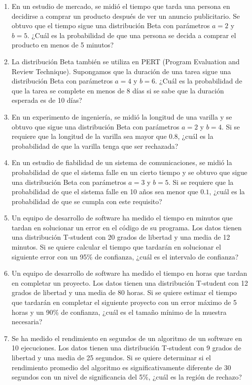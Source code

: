 \begin{Ejer}
\begin{enumerate}
\item En un estudio de mercado, se midió el tiempo que tarda una persona en decidirse a comprar un producto después de ver un anuncio publicitario. Se obtuvo que el tiempo sigue una distribución Beta con parámetros $a=2$ y $b=5$. ¿Cuál es la probabilidad de que una persona se decida a comprar el producto en menos de 5 minutos?

\item La distribución Beta también se utiliza en PERT (Program Evaluation and Review Technique). Supongamos que la duración de una tarea sigue una distribución Beta con parámetros $a=4$ y $b=6$. ¿Cuál es la probabilidad de que la tarea se complete en menos de 8 días si se sabe que la duración esperada es de 10 días?

\item En un experimento de ingeniería, se midió la longitud de una varilla y se obtuvo que sigue una distribución Beta con parámetros $a=2$ y $b=4$. Si se requiere que la longitud de la varilla sea mayor que $0.8$, ¿cuál es la probabilidad de que la varilla tenga que ser rechazada?

\item En un estudio de fiabilidad de un sistema de comunicaciones, se midió la probabilidad de que el sistema falle en un cierto tiempo y se obtuvo que sigue una distribución Beta con parámetros $a=3$ y $b=5$. Si se requiere que la probabilidad de que el sistema falle en 10 años sea menor que $0.1$, ¿cuál es la probabilidad de que se cumpla con este requisito?

\item Un equipo de desarrollo de software ha medido el tiempo en minutos que tardan en solucionar un error en el c\'odigo de su programa. Los datos tienen una distribuci\'on T-student con 20 grados de libertad y una media de 12 minutos. Si se quiere calcular el tiempo que tardar\'an en solucionar el siguiente error con un 95\% de confianza, ¿cu\'al es el intervalo de confianza?

\item Un equipo de desarrollo de software ha medido el tiempo en horas que tardan en completar un proyecto. Los datos tienen una distribuci\'on T-student con 12 grados de libertad y una media de 80 horas. Si se quiere estimar el tiempo que tardar\'an en completar el siguiente proyecto con un error m\'aximo de 5 horas y un 90\% de confianza, ¿cu\'al es el tama\~no m\'inimo de la muestra necesaria?

\item Se ha medido el rendimiento en segundos de un algoritmo de un software en 10 ejecuciones. Los datos tienen una distribuci\'on T-student con 9 grados de libertad y una media de 25 segundos. Si se quiere determinar si el rendimiento promedio del algoritmo es significativamente diferente de 30 segundos con un nivel de significancia del 5\%, ¿cu\'al es la regi\'on de rechazo?


\end{enumerate}
\end{Ejer}
